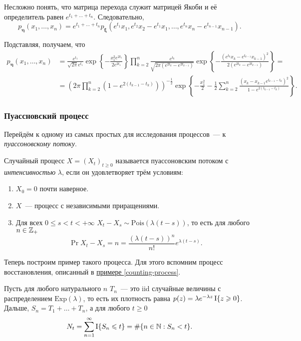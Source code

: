 Несложно понять, что матрица перехода служит матрицей Якоби и её определитель 
равен \(e^{t_{1} + \dots + t_{n}}\). Следовательно, 
\[
	p_{\bm{\eta}}(x_{1}, \dots, x_{n}) = e^{t_{1} + \dots + 
	t_{n}}p_{\bm{\xi}}(e^{t_{1}}x_{1}, e^{t_{2}}x_{2} - e^{t_{1}}x_{1}, \dots, 
	e^{t_{n}}x_{n} - e^{t_{n - 1}}x_{n - 1}).
\]

Подставляя, получаем, что
\begin{align*}
	p_{\bm{\eta}}(x_{1}, \dots, x_{n}) &=\frac{e^{t_{1}}}{\sqrt{2\pi}e^{t_{1}}} 
	\exp\left\{-\frac{x_{1}^{2}e^{2t_{1}}}{2e^{2t_{1}}}\right\}\prod_{k = 
	2}^{n} \frac{e^{t_{k}}}{\sqrt{2\pi(e^{2t_{k}} - e^{2t_{k - 1}})}} 
	\exp\left\{-\frac{(e^{t_{k}}x_{k} - e^{t_{k - 1}}x_{k - 1})^{2}} 
	{2(e^{2t_{k}} - e^{2t_{k - 1}})}\right\} = \\
	&= \left(2\pi\prod_{k = 2}^{n}\left(1 - e^{2(t_{k - 1} - 
	t_{k})}\right)\right)^{-\frac{1}{2}}\exp\left\{-\frac{x_{1}^{2}}{2} - 
	\frac{1}{2}\sum_{k = 2}^{n}\frac{(x_{k} - x_{k - 1}e^{t_{k - 1} - 
	t_{k}})^{2}}{1 - e^{2(t_{k - 1} - t_{k})}}\right\}.
\end{align*}

\subsubsection{Пуассновский процесс}
Перейдём к одному из самых простых для исследования процессов~--- к 
\emph{пуассоновскому потоку}.
\begin{definition}\label{poisson-process-def}
	Случайный процесс \(X = (X_{t})_{t \geq 0}\) называется пуассоновским 
	потоком с \emph{интенсивностью} \(\lambda\), если он удовлетворяет трём 
	условиям:
	\begin{enumerate}
		\item \(X_{0} = 0\) почти наверное.
		\item \(X\)~--- процесс с независимыми приращениями.
		\item Для всех \(0 \leq s < t < +\infty\) \(X_{t} - X_{s} \sim 
		\mathrm{Pois}(\lambda(t - s))\), то есть для любого \(n \in \mathbb{Z}_{+}\)
		\[
			\Pr{X_{t} - X_{s} = n} = \frac{(\lambda(t - 
			s))^{n}}{n!}e^{\lambda(t - s)}.
		\]
	\end{enumerate}
\end{definition}

Теперь построим пример такого процесса. Для этого вспомним процесс 
восстановления, описанный в \hyperref[counting-process]{примере 
\ref*{counting-process}}.

Пусть для любого натурального \(n\) \(T_{n}\)~--- это iid случайные величины с 
распределением \(\mathrm{Exp}(\lambda)\), то есть их плотность равна \(p(z) = 
\lambda e^{-\lambda z}\operatorname{\mathrm{I}}\{z \geqslant 0\}\). Дальше, \(S_{n} = T_{1} + \ldots + 
T_{n}\), а для любого \(t \geq 0\)
\[
	N_{t} = \sum_{n = 1}^{\infty} \operatorname{\mathrm{I}}\{S_{n} \leqslant t\} = \#\{n \in \mathbb{N} : S_{n} < 
	t\}.
\]

